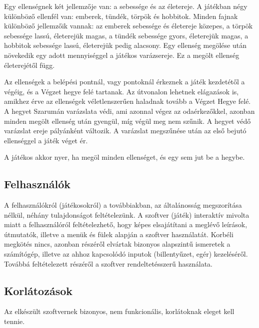 Egy ellenségnek két jellemzője van: a sebessége és az életereje. A játékban négy különböző ellenfél van: emberek, tündék, törpök és hobbitok. Minden fajnak különböző jellemzőik vannak: az emberek sebessége és életereje közepes, a törpök sebessége lassú, életerejük magas, a tündék sebessége gyors, életerejük magas, a hobbitok sebessége lassú, életerejük pedig alacsony. Egy ellenség megölése után növekedik egy adott mennyiséggel a játékos varázsereje. Ez a megölt ellenség életerejétől függ.

Az ellenségek a belépési pontnál, vagy pontoknál érkeznek a játék kezdetétől a végéig, és a Végzet hegye felé tartanak. Az útvonalon lehetnek elágazások is, amikhez érve az ellenségek véletlenszerűen haladnak tovább a Végzet Hegye felé. A hegyet Szarumán varázslata védi, ami azonnal végez az odaérkezőkkel, azonban minden megölt ellenség után gyengül, míg végül meg nem szűnik. A hegyet védő varázslat ereje pályánként változik. A varázslat megszűnése után az első bejutó ellenséggel a játék véget ér. 

A játékos akkor nyer, ha megöl minden ellenséget, és egy sem jut be a hegybe.



\subsection{Felhasználók}

A felhasználókról (játékosokról) a továbbiakban, az általánosság megszorítása nélkül, néhány tulajdonságot feltételezünk. A szoftver (játék) interaktív mivolta miatt a felhasználóról feltételezhető, hogy képes elsajátítani a meglévő leírások, útmutatók, illetve a menük és fülek alapján a szoftver használatát. Korbéli megkötés nincs, azonban részéről elvártak bizonyos alapszintű ismeretek a számítógép, illetve az ahhoz kapcsolódó inputok (billentyűzet, egér) kezeléséről. Továbbá feltételezett részéről a szoftver rendeltetésszerű használata. 


\subsection{Korlátozások}

Az elkészült szoftvernek bizonyos, nem funkcionális, korlátoknak eleget kell tennie. 

